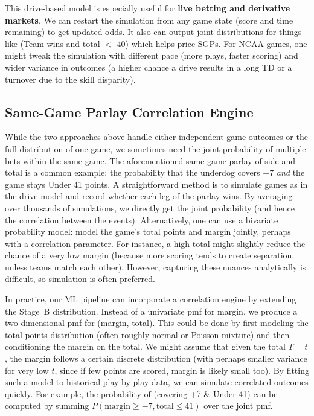 \documentclass[12pt]{article}
\begin{document}
This drive-based model is especially useful for \textbf{live betting and derivative markets}. We can restart the simulation from any game state (score and time remaining) to get updated odds. It also can output joint distributions for things like (Team wins and total $<$ 40) which helps price SGPs. For NCAA games, one might tweak the simulation with different pace (more plays, faster scoring) and wider variance in outcomes (a higher chance a drive results in a long TD or a turnover due to the skill disparity).

\subsection{Same-Game Parlay Correlation Engine}
While the two approaches above handle either independent game outcomes or the full distribution of one game, we sometimes need the joint probability of multiple bets within the same game. The aforementioned same-game parlay of side and total is a common example: the probability that the underdog covers +7 \emph{and} the game stays Under 41 points. A straightforward method is to simulate games as in the drive model and record whether each leg of the parlay wins. By averaging over thousands of simulations, we directly get the joint probability (and hence the correlation between the events). Alternatively, one can use a bivariate probability model: model the game’s total points and margin jointly, perhaps with a correlation parameter. For instance, a high total might slightly reduce the chance of a very low margin (because more scoring tends to create separation, unless teams match each other). However, capturing these nuances analytically is difficult, so simulation is often preferred.

In practice, our ML pipeline can incorporate a correlation engine by extending the Stage~B distribution. Instead of a univariate pmf for margin, we produce a two-dimensional pmf for (margin, total). This could be done by first modeling the total points distribution (often roughly normal or Poisson mixture) and then conditioning the margin on the total. We might assume that given the total $T=t$, the margin follows a certain discrete distribution (with perhaps smaller variance for very low $t$, since if few points are scored, margin is likely small too). By fitting such a model to historical play-by-play data, we can simulate correlated outcomes quickly. For example, the probability of (covering +7 \& Under 41) can be computed by summing $P(\text{margin}\ge -7, \text{total}\le 41)$ over the joint pmf.
\end{document}
